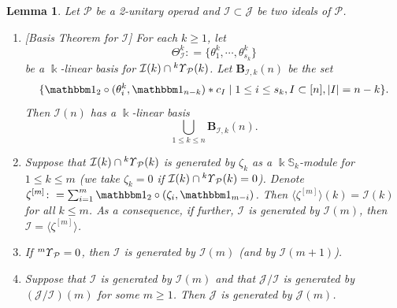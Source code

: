 \documentclass{amsart}
\newtheorem{lem}[thm]{Lemma}
\theoremstyle{definition}
\theoremstyle{remark}
\numberwithin{equation}{section}
\def\S{\mathbb{S}}
\newcommand{\lr}[1]{\langle #1 \rangle}
\newcommand{\up}[1]{{^{#1}{\it \!\Upsilon}}}
\def \I{\mathcal{I}}
\def \J{\mathcal{J}}
\def \ip{{\mathcal{P}}}
\def \1{\mathbbm 1}
\def \S{\mathbb{S}}
\begin{document}
\begin{lem}
\label{yylem1.10}
Let $\ip$ be a 2-unitary operad and $\I\subset \J$ 
be two ideals of $\ip$. 
\begin{enumerate}
\item[(1)]{\rm{[Basis Theorem for $\I$]}}
For each $k\ge 1$, let
\[\Theta^k_{\I}\colon =\{\theta_1^k, \cdots, \theta_{s_k}^k\}\]
be a $\Bbbk$-linear basis for $\I(k)\cap \up{k}_\ip(k)$. 
Let $\textbf{B}_{\I,k}(n)$ be the set
\[\{\1_2\circ (\theta_i^k, \1_{n-k})\ast c_I
\mid 1\le i\le s_k, I\subset [n], |I|=n-k\}.\]
Then $\I(n)$ has a $\Bbbk$-linear basis
\[\bigcup\limits_{1\le k\le n} \textbf{B}_{\I,k}(n).\]
\item[(2)]
Suppose that $\I(k)\cap \up{k}_\ip(k)$ is generated by $\zeta_k$ as a $\Bbbk\S_k$-module 
for $1\leq k\leq m$ {\rm{(}}we take $\zeta_k=0$ if $\I(k)\cap \up{k}_\ip(k)=0${\rm{)}}. 
Denote $\zeta^{[m]}\colon=\sum_{i=1}^{m} \1_2\circ(\zeta_i, \1_{m-i})$. 
Then $\lr{\zeta^{[m]}}(k)=\I(k)$ for all $k\leq m$.
As a consequence, if further, $\I$ is generated by $\I(m)$, 
then $\I=\lr{\zeta^{[m]}}$.
\item[(3)]
If $\up{m}_\ip=0$, then $\I$ is generated by $\I(m)$ {\rm{(}}and by $\I(m+1)${\rm{)}}. 
\item[(4)]
Suppose that $\I$ is generated
by $\I(m)$ and that $\J/\I$ is generated by $(\J/\I)(m)$ for
some $m\geq 1$. Then $\J$ is generated by $\J(m)$. 
\end{enumerate}
\end{lem}
\end{document}
